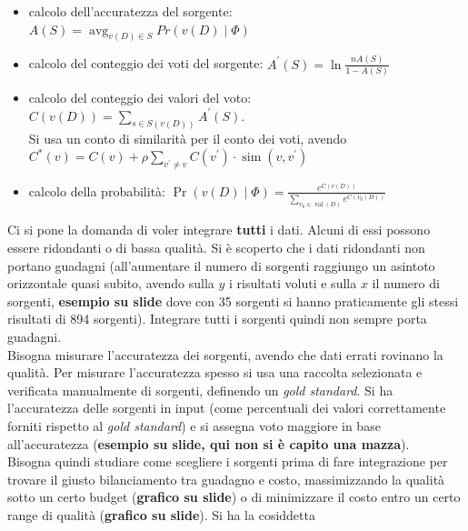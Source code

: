 \documentclass[a4paper,12pt, oneside]{book}
\begin{document}
\begin{itemize}
  \item calcolo dell'accuratezza del sorgente:\\
  $A(S)=\operatorname*{avg}_{v(D)\in S} Pr(v(D) \mid \Phi)$ 
  \item calcolo del conteggio dei voti del sorgente: $A^{\prime}(S)=\ln \frac{n
    A(S)}{1-A(S)}$ 
  \item calcolo del conteggio dei valori del voto:\\
  $C(v(D))=\sum_{s \in S(v(D))}
  A^{\prime}(S)$.\\
  Si usa un conto di similarità per il conto dei voti, avendo\\
  $C^{*}(v)=C(v)+\rho \sum_{v^{\prime} \neq v} C\left(v^{\prime}\right) \cdot
  \operatorname{sim}\left(v, v^{\prime}\right) $
  \item calcolo della probabilità: $\operatorname{Pr}(v(D) \mid
  \Phi)=\frac{e^{C(v(D))}}{\sum_{v_{0} \in 
      \operatorname{val}(D)} e^{C\left(v_{0}(D)\right)}}$ 
\end{itemize}
Ci si pone la domanda di voler integrare \textbf{tutti} i dati. Alcuni di essi
possono essere ridondanti o di bassa qualità. Si è scoperto che i dati
ridondanti non portano guadagni (all'aumentare il numero di sorgenti raggiungo
un asintoto orizzontale quasi subito, avendo sulla $y$ i risultati voluti e
sulla $x$ il numero di sorgenti, \textbf{esempio su slide} dove con 35 sorgenti
si hanno praticamente gli stessi risultati di 894 sorgenti). Integrare tutti i
sorgenti quindi non sempre porta guadagni.\\
Bisogna misurare l'accuratezza dei sorgenti, avendo che dati errati rovinano la
qualità. Per misurare l'accuratezza spesso si usa una raccolta selezionata e
verificata manualmente di sorgenti, definendo un \textit{gold standard}. Si ha
l'accuratezza delle sorgenti in input (come percentuali dei valori
correttamente forniti rispetto al \textit{gold standard}) e si assegna voto
maggiore in base all'accuratezza (\textbf{esempio su slide, qui non si è capito
  una mazza}).\\
Bisogna quindi studiare come scegliere i sorgenti prima di fare integrazione per
trovare il giusto bilanciamento tra guadagno e costo, massimizzando la qualità
sotto un certo budget (\textbf{grafico su slide}) o di minimizzare il costo
entro un certo range di qualità (\textbf{grafico su slide}). Si ha la cosiddetta
\end{document}
